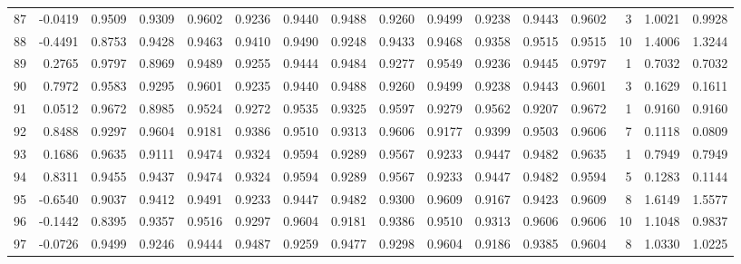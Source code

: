 \begin{tabular}{lrrrrrrrrrrrrrrr}
87  &     -0.0419 &  0.9509 &  0.9309 &  0.9602 &  0.9236 &  0.9440 &  0.9488 &  0.9260 &  0.9499 &  0.9238 &   0.9443 &     0.9602 &      3 &                    1.0021 &                     0.9928 \\
88  &     -0.4491 &  0.8753 &  0.9428 &  0.9463 &  0.9410 &  0.9490 &  0.9248 &  0.9433 &  0.9468 &  0.9358 &   0.9515 &     0.9515 &     10 &                    1.4006 &                     1.3244 \\
89  &      0.2765 &  0.9797 &  0.8969 &  0.9489 &  0.9255 &  0.9444 &  0.9484 &  0.9277 &  0.9549 &  0.9236 &   0.9445 &     0.9797 &      1 &                    0.7032 &                     0.7032 \\
90  &      0.7972 &  0.9583 &  0.9295 &  0.9601 &  0.9235 &  0.9440 &  0.9488 &  0.9260 &  0.9499 &  0.9238 &   0.9443 &     0.9601 &      3 &                    0.1629 &                     0.1611 \\
91  &      0.0512 &  0.9672 &  0.8985 &  0.9524 &  0.9272 &  0.9535 &  0.9325 &  0.9597 &  0.9279 &  0.9562 &   0.9207 &     0.9672 &      1 &                    0.9160 &                     0.9160 \\
92  &      0.8488 &  0.9297 &  0.9604 &  0.9181 &  0.9386 &  0.9510 &  0.9313 &  0.9606 &  0.9177 &  0.9399 &   0.9503 &     0.9606 &      7 &                    0.1118 &                     0.0809 \\
93  &      0.1686 &  0.9635 &  0.9111 &  0.9474 &  0.9324 &  0.9594 &  0.9289 &  0.9567 &  0.9233 &  0.9447 &   0.9482 &     0.9635 &      1 &                    0.7949 &                     0.7949 \\
94  &      0.8311 &  0.9455 &  0.9437 &  0.9474 &  0.9324 &  0.9594 &  0.9289 &  0.9567 &  0.9233 &  0.9447 &   0.9482 &     0.9594 &      5 &                    0.1283 &                     0.1144 \\
95  &     -0.6540 &  0.9037 &  0.9412 &  0.9491 &  0.9233 &  0.9447 &  0.9482 &  0.9300 &  0.9609 &  0.9167 &   0.9423 &     0.9609 &      8 &                    1.6149 &                     1.5577 \\
96  &     -0.1442 &  0.8395 &  0.9357 &  0.9516 &  0.9297 &  0.9604 &  0.9181 &  0.9386 &  0.9510 &  0.9313 &   0.9606 &     0.9606 &     10 &                    1.1048 &                     0.9837 \\
97  &     -0.0726 &  0.9499 &  0.9246 &  0.9444 &  0.9487 &  0.9259 &  0.9477 &  0.9298 &  0.9604 &  0.9186 &   0.9385 &     0.9604 &      8 &                    1.0330 &                     1.0225 \\

\end{tabular}
